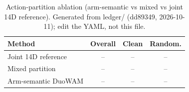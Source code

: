\begin{table}[t]
  \caption{Action-partition ablation (arm-semantic vs mixed vs joint 14D reference). Generated from ledger/ (dd89349, 2026-10-11); edit the YAML, not this file.}
  \label{tab:action_partition_ablation}
  \centering
  \footnotesize
  \setlength{\tabcolsep}{3pt}
  \renewcommand{\arraystretch}{1.08}
  \begin{tabular*}{\columnwidth}{@{\extracolsep{\fill}}lccc@{}}
    \toprule
    Method & Overall & Clean & Random. \\
    \midrule
    Joint 14D reference & -- & -- & -- \\
    Mixed partition & -- & -- & -- \\
    Arm-semantic DuoWAM & -- & -- & -- \\
    \bottomrule
  \end{tabular*}
\end{table}
